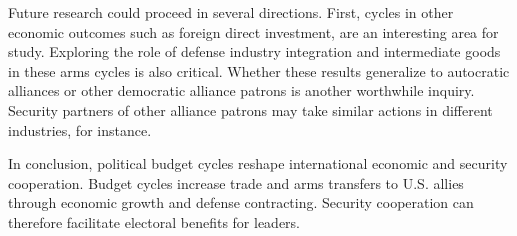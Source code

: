 \documentclass[12pt]{article}
\begin{document}
Future research could proceed in several directions. 
First, cycles in other economic outcomes such as foreign direct investment, are an interesting area for study. 
Exploring the role of defense industry integration and intermediate goods in these arms cycles is also critical.
Whether these results generalize to autocratic alliances or other democratic alliance patrons is another worthwhile inquiry. 
Security partners of other alliance patrons may take similar actions in different industries, for instance.


In conclusion, political budget cycles reshape international economic and security cooperation.
Budget cycles increase trade and arms transfers to U.S. allies through economic growth and defense contracting.
Security cooperation can therefore facilitate electoral benefits for leaders. 


\newpage
\singlespace
 
 
\end{document}

